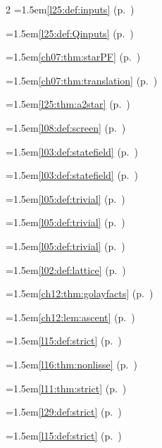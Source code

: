 \begin{multicols}{2}
\hangindent=1.5em\quad \ref{l25:def:inputs} (p.~\pageref{l25:def:inputs})\par
\hangindent=1.5em\quad \ref{l25:def:Qinputs} (p.~\pageref{l25:def:Qinputs})\par
\hangindent=1.5em\quad \ref{ch07:thm:starPF} (p.~\pageref{ch07:thm:starPF})\par
\hangindent=1.5em\quad \ref{ch07:thm:translation} (p.~\pageref{ch07:thm:translation})\par
\hangindent=1.5em\quad \ref{l25:thm:a2star} (p.~\pageref{l25:thm:a2star})\par
\hangindent=1.5em\quad \ref{l08:def:screen} (p.~\pageref{l08:def:screen})\par
\hangindent=1.5em\quad \ref{l03:def:statefield} (p.~\pageref{l03:def:statefield})\par
\hangindent=1.5em\quad \ref{l03:def:statefield} (p.~\pageref{l03:def:statefield})\par
\hangindent=1.5em\quad \ref{l05:def:trivial} (p.~\pageref{l05:def:trivial})\par
\hangindent=1.5em\quad \ref{l05:def:trivial} (p.~\pageref{l05:def:trivial})\par
\hangindent=1.5em\quad \ref{l05:def:trivial} (p.~\pageref{l05:def:trivial})\par
\hangindent=1.5em\quad \ref{l02:def:lattice} (p.~\pageref{l02:def:lattice})\par
\hangindent=1.5em\quad \ref{ch12:thm:golayfacts} (p.~\pageref{ch12:thm:golayfacts})\par
\hangindent=1.5em\quad \ref{ch12:lem:ascent} (p.~\pageref{ch12:lem:ascent})\par
\hangindent=1.5em\quad \ref{l15:def:strict} (p.~\pageref{l15:def:strict})\par
\hangindent=1.5em\quad \ref{l16:thm:nonlisse} (p.~\pageref{l16:thm:nonlisse})\par
\hangindent=1.5em\quad \ref{l11:thm:strict} (p.~\pageref{l11:thm:strict})\par
\hangindent=1.5em\quad \ref{l29:def:strict} (p.~\pageref{l29:def:strict})\par
\hangindent=1.5em\quad \ref{l15:def:strict} (p.~\pageref{l15:def:strict})\par

\end{multicols}

